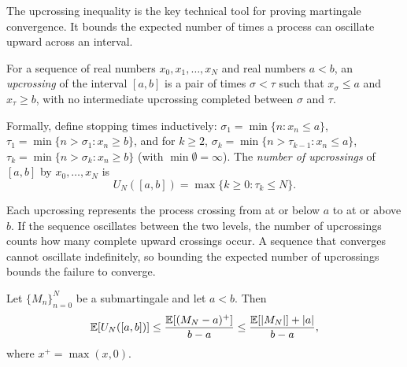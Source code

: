 \documentclass[11pt,a4paper]{article}
\begin{document}
The upcrossing inequality is the key technical tool for proving
martingale convergence.  It bounds the expected number of times a
process can oscillate upward across an interval.

\begin{definition}[Upcrossings]
\label{def:upcrossing}
For a sequence of real numbers $x_0, x_1, \ldots, x_N$ and real
numbers $a < b$, an \emph{upcrossing} of the interval $[a, b]$
is a pair of times $\sigma < \tau$ such that $x_\sigma \leq a$
and $x_\tau \geq b$, with no intermediate upcrossing completed
between $\sigma$ and $\tau$.

Formally, define stopping times inductively:
$\sigma_1 = \min\{n : x_n \leq a\}$,
$\tau_1 = \min\{n > \sigma_1 : x_n \geq b\}$, and for $k \geq 2$,
$\sigma_k = \min\{n > \tau_{k-1} : x_n \leq a\}$,
$\tau_k = \min\{n > \sigma_k : x_n \geq b\}$
(with $\min \emptyset = \infty$).  The \emph{number of
upcrossings} of $[a,b]$ by $x_0, \ldots, x_N$ is
\begin{equation}
  U_N([a,b]) = \max\{k \geq 0 : \tau_k \leq N\}.
  \label{eq:upcrossing_count}
\end{equation}
\end{definition}

\begin{remark}
Each upcrossing represents the process crossing from at or below
$a$ to at or above $b$.  If the sequence oscillates between the
two levels, the number of upcrossings counts how many complete
upward crossings occur.  A sequence that converges cannot
oscillate indefinitely, so bounding the expected number of
upcrossings bounds the failure to converge.
\end{remark}

\begin{keyresult}[title={Doob's Upcrossing Inequality}]
\begin{theorem}
\label{thm:upcrossing}
Let $\{M_n\}_{n=0}^N$ be a submartingale and let $a < b$.  Then
\begin{equation}
  \mathbb{E}[U_N([a,b])]
  \leq \frac{\mathbb{E}\!\left[(M_N - a)^+\right]}{b - a}
  \leq \frac{\mathbb{E}[|M_N|] + |a|}{b - a},
  \label{eq:upcrossing_ineq}
\end{equation}
where $x^+ = \max(x, 0)$.
\end{theorem}
\end{keyresult}
\end{document}
